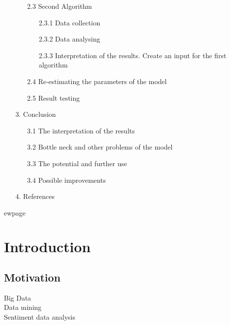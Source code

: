 \documentclass[12pt, a4paper]{article}
\begin{document}
\begin{enumerate}
\begin{enumerate}
			\item[2.3] Second Algorithm
				\begin{enumerate}
					\item[2.3.1] Data collection
					\item[2.3.2] Data analysing
					\item[2.3.3] Interpretation of the results. Create an input for the first algorithm
				\end{enumerate}
			\item[2.4] Re-estimating the parameters of the model 
			\item[2.5] Result testing
		\end{enumerate}
	\item[3.] Conclusion
		\begin{enumerate}
			\item[3.1] The interpretation of the results
			\item[3.2] Bottle neck and other problems of the model
			\item[3.3] The potential and further use
			\item[3.4] Possible improvements
		\end{enumerate}
	\item[4.] References
\end{enumerate}

 ewpage
\section{Introduction}
\subsection{Motivation}
Big Data\\
Data mining\\
Sentiment data analysis
\end{document}

